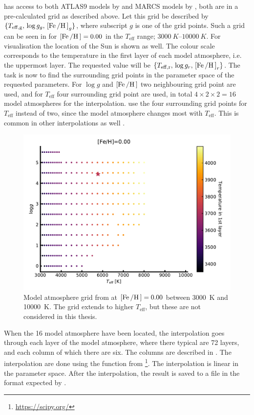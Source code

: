 has access to both ATLAS9 models by \citet{Kurucz1993} and MARCS models by
\citet{Gustafson2008}, both are in a pre-calculated grid as described above. Let this grid be
described by $\{T_\mathrm{eff,g},\, \log g_g,\, [\ion{Fe}/\ion{H}]_g\}$, where subscript $g$ is one
of the grid points. Such a grid can be seen in  for $[\ion{Fe}/\ion{H}]=0.00$ in the
$T_\mathrm{eff}$ range; $\SIrange{3000}{10000}{K}$. For visualisation the location of the Sun is
shown as well. The colour scale corresponds to the temperature in the first layer of each model
atmosphere, i.e. the uppermost layer. The requested value will be $\{T_\mathrm{eff,r},\,\log
g_r,\,[\ion{Fe}/\ion{H}]_r\}$. The task is now to find the surrounding grid points in the parameter
space of the requested parameters. For $\log g$ and $[\ion{Fe}/\ion{H}]$ two neighbouring grid point
are used, and for $T_\mathrm{eff}$ four surrounding grid point are used, in total
$4\times2\times2=16$ model atmospheres for the interpolation.  use the four surrounding
grid points for $T_\mathrm{eff}$ instead of two, since the model atmosphere changes most with
$T_\mathrm{eff}$. This is common in other interpolations as well \citep[see e.g.][]{Valenti1996}.

\begin{figure}[htpb!]
    \centering
    \includegraphics[width=0.85\linewidth]{figures/model_atmosphere.pdf}
    \caption{Model atmosphere grid from \citet{Kurucz1993} at $[\ion{Fe}/\ion{H}]=0.00$ between
             \SI{3000}{K} and \SI{10000}{K}. The grid extends to higher $T_\mathrm{eff}$, but these
             are not considered in this thesis.}
    \label{fig:grid}
\end{figure}

When the 16 model atmosphere have been located, the interpolation goes through each layer of the
model atmosphere, where there typical are 72 layers, and each column of which there are six. The
columns are described in . The interpolation are done using the
 function from \footnote{\url{https://scipy.org/}}. The interpolation is
linear in the parameter space. After the interpolation, the result is saved to a file in the format
expected by .




